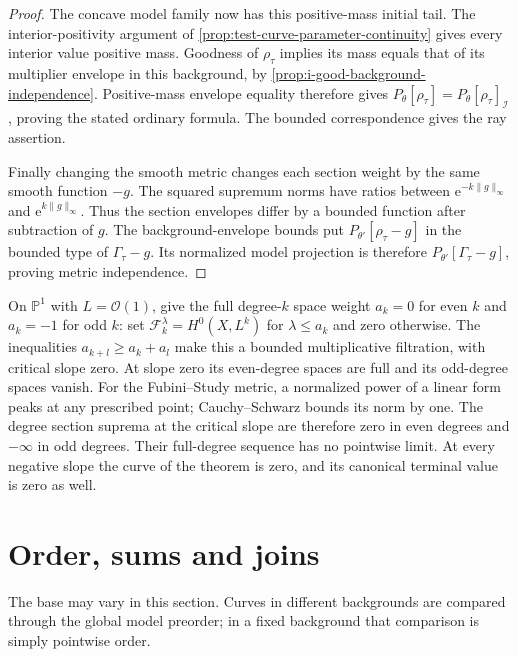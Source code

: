 \begin{proof}
The concave model family now has this positive-mass initial tail. The interior-positivity argument of \cref{prop:test-curve-parameter-continuity} gives every interior value positive mass. Goodness of $\rho_\tau$ implies its mass equals that of its multiplier envelope in this background, by \cref{prop:i-good-background-independence}. Positive-mass envelope equality therefore gives
$P_\theta[\rho_\tau]=P_\theta[\rho_\tau]_{\mathcal I}$,
proving the stated ordinary formula. The bounded correspondence gives the ray assertion.

Finally changing the smooth metric changes each section weight by the same smooth function $-g$. The squared supremum norms have ratios between $\mathrm e^{-k\|g\|_\infty}$ and $\mathrm e^{k\|g\|_\infty}$. Thus the section envelopes differ by a bounded function after subtraction of $g$. The background-envelope bounds put $P_{\theta'}[\rho_\tau-g]$ in the bounded type of $\Gamma_\tau-g$. Its normalized model projection is therefore $P_{\theta'}[\Gamma_\tau-g]$, proving metric independence.
\end{proof}

\begin{example}\label{ex:critical-filtration-degree-oscillation}
On $\mathbb P^1$ with $L=\mathcal O(1)$, give the full degree-$k$ space weight $a_k=0$ for even $k$ and $a_k=-1$ for odd $k$: set $\mathcal F_k^\lambda=H^0(X,L^k)$ for $\lambda\leq a_k$ and zero otherwise. The inequalities $a_{k+l}\geq a_k+a_l$ make this a bounded multiplicative filtration, with critical slope zero. At slope zero its even-degree spaces are full and its odd-degree spaces vanish. For the Fubini--Study metric, a normalized power of a linear form peaks at any prescribed point; Cauchy--Schwarz bounds its norm by one. The degree section suprema at the critical slope are therefore zero in even degrees and $-\infty$ in odd degrees. Their full-degree sequence has no pointwise limit. At every negative slope the curve of the theorem is zero, and its canonical terminal value is zero as well.
\end{example}

\section{Order, sums and joins}
\label{sec:test-curve-operations}
The base may vary in this section. Curves in different backgrounds are compared through the global model preorder; in a fixed background that comparison is simply pointwise order.

